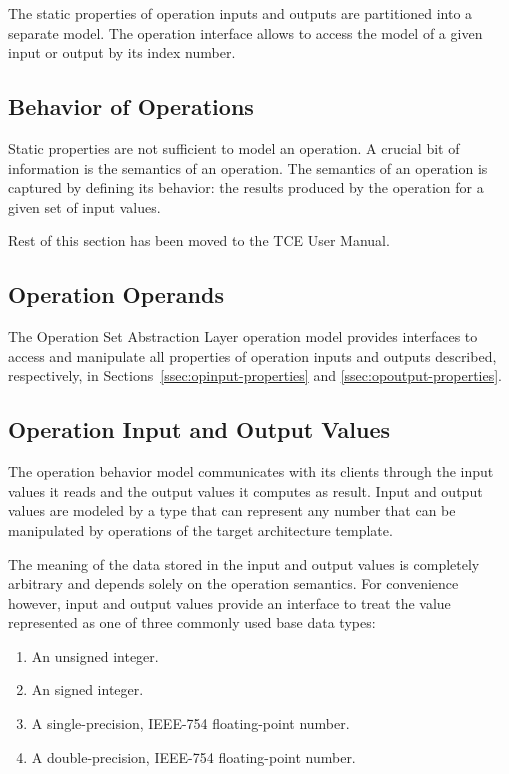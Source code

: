 \documentclass[twoside]{tce}
\begin{document}
The static properties of operation inputs and outputs are partitioned into a
separate model.  The operation interface allows to access the model of 
a given input or output by its index number.

\subsection{Behavior of Operations}

Static properties are not sufficient to model an operation.  A crucial bit
of information is the semantics of an operation.  The semantics of an
operation is captured by defining its behavior: the results produced by the
operation for a given set of input values.

Rest of this section has been moved to the TCE User Manual.

\subsection{Operation Operands}
\label{ssec:operand}

The Operation Set Abstraction Layer operation model provides interfaces to
access and manipulate all properties of operation inputs and outputs
described, respectively, in Sections~\ref{ssec:opinput-properties} and
\ref{ssec:opoutput-properties}.

\subsection{Operation Input and Output Values}
\label{ssec:io-values}

The operation behavior model communicates with its clients through the
input values it reads and the output values it computes as result.  Input
and output values are modeled by a type that can represent any number that
can be manipulated by operations of the target architecture template.

The meaning of the data stored in the input and output values is completely
arbitrary and depends solely on the operation semantics.
%
For convenience however, input and output values provide an interface to
treat the value represented as one of three commonly used base data types:
\begin{enumerate}
\item An unsigned integer.
\item An signed integer.
\item A single-precision, IEEE-754 floating-point number.
\item A double-precision, IEEE-754 floating-point number.
\end{enumerate}
\end{document}
